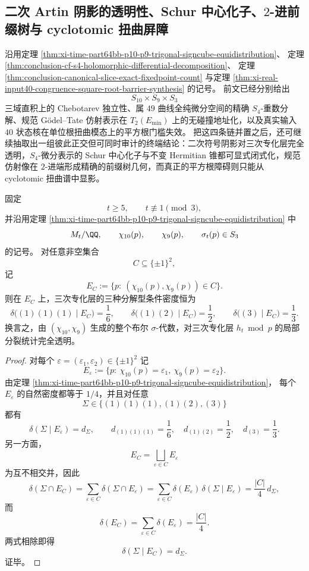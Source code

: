 \subsection{二次 Artin 阴影的透明性、Schur 中心化子、\texorpdfstring{$2$}{2}-进前缀树与 cyclotomic 扭曲屏障}\label{subsec:conclusion-artin-shadow-schur-prefix-cyclotomic-obstruction}
沿用定理 \ref{thm:xi-time-part64bb-p10-p9-trigonal-signcube-equidistribution}、
定理 \ref{thm:conclusion-cf-s4-holomorphic-differential-decomposition}、
定理 \ref{thm:conclusion-canonical-slice-exact-fixedpoint-count}
与定理 \ref{thm:xi-real-input40-congruence-square-root-barrier-synthesis} 的记号。
前文已经分别给出
\[
S_{10}\times S_9\times S_3
\]
三域直积上的 Chebotarev 独立性、属 \(49\) 曲线全纯微分空间的精确 \(S_4\)-重数分解、规范 Gödel--Tate 仿射表示在 \(T_2(E_{\min})\) 上的无碰撞地址化，以及真实输入 \(40\) 状态核在单位根扭曲模态上的平方根门槛失效。
把这四条链并置之后，还可继续抽取出一组彼此正交但可同时审计的终端结论：二次符号阴影对三次专化层完全透明，\(S_4\)-微分表示的 Schur 中心化子与不变 Hermitian 锥都可显式闭式化，规范仿射像在 \(2\)-进端形成精确的前缀树几何，而真正的平方根障碍则只能从 cyclotomic 扭曲谱中显影。

\begin{theorem}[双符号圆柱对三次专化层的条件透明性]\label{thm:conclusion-double-sign-cylinder-trigonal-transparency}
固定
\[
t\ge 5,
\qquad
t\not\equiv 1\pmod 3,
\]
并沿用定理 \ref{thm:xi-time-part64bb-p10-p9-trigonal-signcube-equidistribution} 中
\[
M_t/\QQ,\qquad
\chi_{10}(p),\qquad
\chi_9(p),\qquad
\sigma_t(p)\in S_3
\]
的记号。
对任意非空集合
\[
C\subseteq \{\pm 1\}^2,
\]
记
\[
E_C:=\{p:\ (\chi_{10}(p),\chi_9(p))\in C\}.
\]
则在 \(E_C\) 上，三次专化层的三种分解型条件密度恒为
\[
\delta\bigl((1)(1)(1)\mid E_C\bigr)=\frac16,
\qquad
\delta\bigl((1)(2)\mid E_C\bigr)=\frac12,
\qquad
\delta\bigl((3)\mid E_C\bigr)=\frac13.
\]
换言之，由 \((\chi_{10},\chi_9)\) 生成的整个布尔 \(\sigma\)-代数，对三次专化层 \(h_t\bmod p\) 的局部分裂统计完全透明。
\end{theorem}
\begin{proof}
对每个
\(
\varepsilon=(\varepsilon_1,\varepsilon_2)\in\{\pm 1\}^2
\)
记
\[
E_\varepsilon:=\{p:\ \chi_{10}(p)=\varepsilon_1,\ \chi_9(p)=\varepsilon_2\}.
\]
由定理 \ref{thm:xi-time-part64bb-p10-p9-trigonal-signcube-equidistribution}，
每个 \(E_\varepsilon\) 的自然密度都等于 \(1/4\)，并且对任意
\[
\Sigma\in\{(1)(1)(1),(1)(2),(3)\}
\]
都有
\[
\delta(\Sigma\mid E_\varepsilon)=d_\Sigma,
\qquad
d_{(1)(1)(1)}=\frac16,\quad
d_{(1)(2)}=\frac12,\quad
d_{(3)}=\frac13.
\]
另一方面，
\[
E_C=\bigsqcup_{\varepsilon\in C}E_\varepsilon
\]
为互不相交并，因此
\[
\delta(\Sigma\cap E_C)
=
\sum_{\varepsilon\in C}\delta(\Sigma\cap E_\varepsilon)
=
\sum_{\varepsilon\in C}\delta(E_\varepsilon)\,\delta(\Sigma\mid E_\varepsilon)
=
\frac{|C|}{4}\,d_\Sigma,
\]
而
\[
\delta(E_C)=\sum_{\varepsilon\in C}\delta(E_\varepsilon)=\frac{|C|}{4}.
\]
两式相除即得
\[
\delta(\Sigma\mid E_C)=d_\Sigma.
\]
证毕。
\end{proof}

